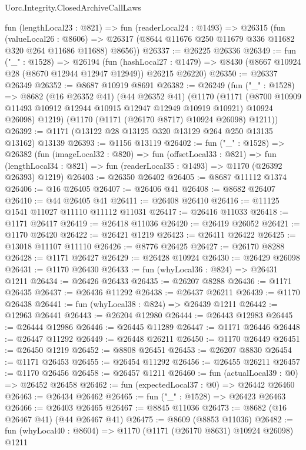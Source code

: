 \begin{lexlean}{Uorc.Integrity.ClosedArchiveCallLaws}
\begin{coremodule}
    fun (lengthLocal23 : @821) =>
    fun (readerLocal24 : @1493) =>
    @26315
      (fun (valueLocal26 : @8606) =>
      @26317 (@8644 @11676 @250 @11679 @336 @11682 @320 @264 @11686 @11688) @8656))
@26337 := @26225 @26336
@26349 := fun ("_" : @1528) =>
  @26194
    (fun (hashLocal27 : @1479) =>
    @8430 (@8667 @10924 @28 (@8670 @12944 @12947 @12949)) @26215 @26220)
@26350 := @26337 @26349
@26352 := @8687 @10919 @8691
@26382 := @26249
    (fun ("_" : @1528) =>
    @8682
      (@16 @26352 @41)
      (@44 @26352 @41)
      (@1170
        (@1171 (@8700 @10909 @11493 @10912 @12944 @10915 @12947 @12949 @10919 @10921) @10924 @26098)
        @1219)
      (@1170 (@1171 (@26170 @8717) @10924 @26098) @1211))
@26392 := @1171 (@13122 @28 @13125 @320 @13129 @264 @250 @13135 @13162) @13139
@26393 := @1156 @13119
@26402 := fun ("_" : @1528) =>
  @26382
    (fun (imageLocal32 : @820) =>
    fun (offsetLocal33 : @821) =>
    fun (lengthLocal34 : @821) => fun (readerLocal35 : @1493) => @1170 (@26392 @26393) @1219)
@26403 := @26350 @26402
@26405 := @8687 @11112 @1374
@26406 := @16 @26405
@26407 := @26406 @41
@26408 := @8682 @26407
@26410 := @44 @26405 @41
@26411 := @26408 @26410
@26416 := @11125 @1541 @11027 @11110 @11112 @11031
@26417 := @26416 @11033
@26418 := @1171 @26417
@26419 := @26418 @11036
@26420 := @26419 @26052
@26421 := @1170 @26420
@26422 := @26421 @1219
@26423 := @26411 @26422
@26425 := @13018 @11107 @11110
@26426 := @8776 @26425
@26427 := @26170 @8288
@26428 := @1171 @26427
@26429 := @26428 @10924
@26430 := @26429 @26098
@26431 := @1170 @26430
@26433 := fun (whyLocal36 : @824) => @26431 @1211
@26434 := @26426 @26433
@26435 := @26207 @8288
@26436 := @1171 @26435
@26437 := @26436 @11292
@26438 := @26437 @26211
@26439 := @1170 @26438
@26441 := fun (whyLocal38 : @824) => @26439 @1211
@26442 := @12963 @26441
@26443 := @26204 @12980
@26444 := @26443 @12983
@26445 := @26444 @12986
@26446 := @26445 @11289
@26447 := @1171 @26446
@26448 := @26447 @11292
@26449 := @26448 @26211
@26450 := @1170 @26449
@26451 := @26450 @1219
@26452 := @8808 @26451
@26453 := @26207 @8830
@26454 := @1171 @26453
@26455 := @26454 @11292
@26456 := @26455 @26211
@26457 := @1170 @26456
@26458 := @26457 @1211
@26460 := fun (actualLocal39 : @0) => @26452 @26458
@26462 := fun (expectedLocal37 : @0) => @26442 @26460
@26463 := @26434 @26462
@26465 := fun ("_" : @1528) => @26423 @26463
@26466 := @26403 @26465
@26467 := @8845 @11036
@26473 := @8682 (@16 @26467 @41) (@44 @26467 @41)
@26475 := @8609 (@8853 @11036)
@26482 := fun (whyLocal40 : @8604) => @1170 (@1171 (@26170 @8631) @10924 @26098) @1211

\end{coremodule}
\end{lexlean}
